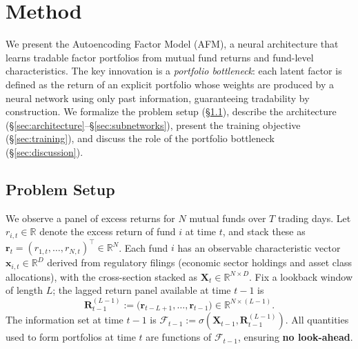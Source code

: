 
\section{Method}\label{sec:method}

We present the Autoencoding Factor Model (AFM), a neural architecture that learns tradable factor portfolios from mutual fund returns and fund-level characteristics. The key innovation is a \emph{portfolio bottleneck}: each latent factor is defined as the return of an explicit portfolio whose weights are produced by a neural network using only past information, guaranteeing tradability by construction. We formalize the problem setup (\S\ref{sec:setup}), describe the architecture (\S\ref{sec:architecture}--\S\ref{sec:subnetworks}), present the training objective (\S\ref{sec:training}), and discuss the role of the portfolio bottleneck (\S\ref{sec:discussion}).

\subsection{Problem Setup}\label{sec:setup}

We observe a panel of excess returns for $N$ mutual funds over $T$ trading days. Let $r_{i,t} \in \mathbb{R}$ denote the excess return of fund $i$ at time $t$, and stack these as $\mathbf{r}_t = (r_{1,t}, \ldots, r_{N,t})^\top \in \mathbb{R}^N$. Each fund $i$ has an observable characteristic vector $\mathbf{x}_{i,t} \in \mathbb{R}^D$ derived from regulatory filings (economic sector holdings and asset class allocations), with the cross-section stacked as $\mathbf{X}_t \in \mathbb{R}^{N \times D}$. Fix a lookback window of length $L$; the lagged return panel available at time $t-1$ is
\begin{equation}\label{eq:lookback}
    \mathbf{R}_{t-1}^{(L-1)} := \big(\mathbf{r}_{t-L+1}, \ldots, \mathbf{r}_{t-1}\big) \in \mathbb{R}^{N \times (L-1)}.
\end{equation}
The information set at time $t-1$ is $\mathcal{F}_{t-1} := \sigma\!\left(\mathbf{X}_{t-1}, \mathbf{R}_{t-1}^{(L-1)}\right)$. All quantities used to form portfolios at time $t$ are functions of $\mathcal{F}_{t-1}$, ensuring \textbf{no look-ahead}.

